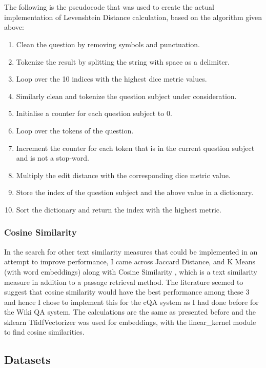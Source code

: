 \documentclass[12pt, a4paper]{article}
\begin{document}
\\~\\ 
The following is the pseudocode that was used to create the actual implementation of Levenshtein Distance calculation, based on the algorithm given above: 

\begin{enumerate}
    \item Clean the question by removing symbols and punctuation. 
    \item Tokenize the result by splitting the string with space as a delimiter. 
    \item Loop over the 10 indices with the highest dice metric values. 
    \item Similarly clean and tokenize the question subject under consideration. 
    \item Initialise a counter for each question subject to 0. 
    \item Loop over the tokens of the question. 
    \item Increment the counter for each token that is in the current question subject and is not a stop-word. 
    \item Multiply the edit distance with the corresponding dice metric value. 
    \item Store the index of the question subject and the above value in a dictionary. 
    \item Sort the dictionary and return the index with the highest metric. 
\end{enumerate}

\subsubsection{Cosine Similarity} 

In the search for other text similarity measures that could be implemented in an attempt to improve performance, I came across Jaccard Distance, and K Means (with word embeddings) \cite{textsims} along with Cosine Similarity \cite{similarityMet}, which is a text similarity measure in addition to a passage retrieval method. The literature seemed to suggest that cosine similarity would have the best performance among these 3 and hence I chose to implement this for the cQA system as I had done before for the Wiki QA system. The calculations are the same as presented before and the sklearn TfidfVectorizer was used for embeddings, with the linear\_kernel module to find cosine similarities. 

\subsection{Datasets} 
\end{document}

